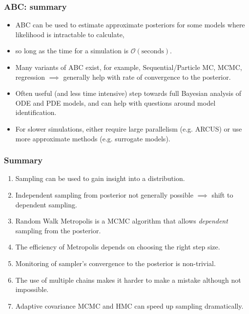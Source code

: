 \documentclass[handout]{beamer}
\begin{document}
\begin{frame}
	\frametitle{ABC: summary}
	
	\begin{itemize}
		\item<2-> ABC can be used to estimate approximate posteriors for some models where likelihood is intractable to calculate,
		\item<3-> so long as the time for a simulation is $\mathcal{O}(\text{seconds})$.
		\item<4-> Many variants of ABC exist, for example, Sequential/Particle MC, MCMC, regression $\implies$ generally help with rate of convergence to the posterior.
		\item<5-> Often useful (and less time intensive) step towards full Bayesian analysis of ODE and PDE models, and can help with questions around model identification.
		\item<6-> For slower simulations, either require large parallelism (e.g. ARCUS) or use more approximate methods (e.g. surrogate models).
	\end{itemize}
	
\end{frame}

\begin{frame}
\frametitle{Summary}

\begin{enumerate}
\item<2-> Sampling can be used to gain insight into a distribution.
\item<3-> Independent sampling from posterior not generally possible $\implies$ shift to dependent sampling.
\item<4-> Random Walk Metropolis is a MCMC algorithm that allows \textit{dependent} sampling from the posterior.
\item<5-> The efficiency of Metropolis depends on choosing the right step size.
\item<6-> Monitoring of sampler's convergence to the posterior is non-trivial.
\item<7-> The use of multiple chains makes it harder to make a mistake although not impossible.
\item<8-> Adaptive covariance MCMC and HMC can speed up sampling dramatically.
\end{enumerate}

\end{frame}
\end{document}
